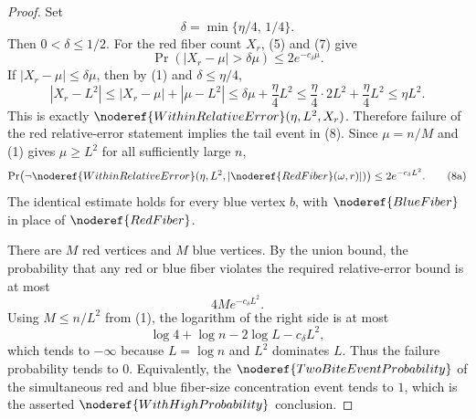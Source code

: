 \begin{proof}
Set
\[
\delta=\min\{\eta/4,\,1/4\}.
\]
Then \(0<\delta\le1/2\).  For the red fiber count \(X_r\), (5) and (7) give
\[
\Pr(|X_r-\mu|>\delta\mu)\le 2e^{-c_\delta\mu}.
\tag{8}
\]
If \(|X_r-\mu|\le\delta\mu\), then by (1) and
\(\delta\le\eta/4\),
\[
|X_r-L^2|
\le |X_r-\mu|+|\mu-L^2|
\le \delta\mu+\frac{\eta}{4}L^2
\le \frac{\eta}{4}\cdot 2L^2+\frac{\eta}{4}L^2
\le \eta L^2.
\]
This is exactly
\(\noderef{WithinRelativeError}(\eta,L^2,X_r)\).  Therefore failure of the
red relative-error statement implies the tail event in (8).  Since
\(\mu=n/M\) and (1) gives \(\mu\ge L^2\) for all sufficiently large \(n\),
\[
\Pr\bigl(\neg\noderef{WithinRelativeError}
(\eta,L^2,|\noderef{RedFiber}(\omega,r)|)\bigr)
\le 2e^{-c_\delta L^2}.
\tag{8a}
\]
The identical estimate holds for every blue vertex \(b\), with
\(\noderef{BlueFiber}\) in place of \(\noderef{RedFiber}\).

There are \(M\) red vertices and \(M\) blue vertices.  By the union bound, the
probability that any red or blue fiber violates the required relative-error
bound is at most
\[
4M e^{-c_\delta L^2}.
\tag{9}
\]
Using \(M\le n/L^2\) from (1), the logarithm of the right side is at most
\[
\log 4+\log n-2\log L-c_\delta L^2,
\]
which tends to \(-\infty\) because \(L=\log n\) and \(L^2\) dominates \(L\).
Thus the failure probability tends to \(0\).  Equivalently, the
\(\noderef{TwoBiteEventProbability}\) of the simultaneous red and blue
fiber-size concentration event tends to \(1\), which is the asserted
\(\noderef{WithHighProbability}\) conclusion.
\end{proof}
